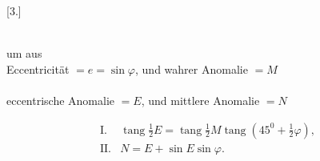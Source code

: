 \clearpage
\begingroup
{}
\begin{center}
[3.]\par\medskip
{}\\
um aus\\
Eccentricität $=e=\sin\varphi$, und wahrer Anomalie $=M$\\
\\
eccentrische Anomalie $=E$, und mittlere Anomalie $=N$
\end{center}
\[
\begin{array}{rl}
\mathrm{I.}&\operatorname{tang}\tfrac12E=\operatorname{tang}\tfrac12M\operatorname{tang}(45^0+\tfrac12\varphi),\\
\mathrm{II.}&N=E+\sin E\sin\varphi.
\end{array}
\]

